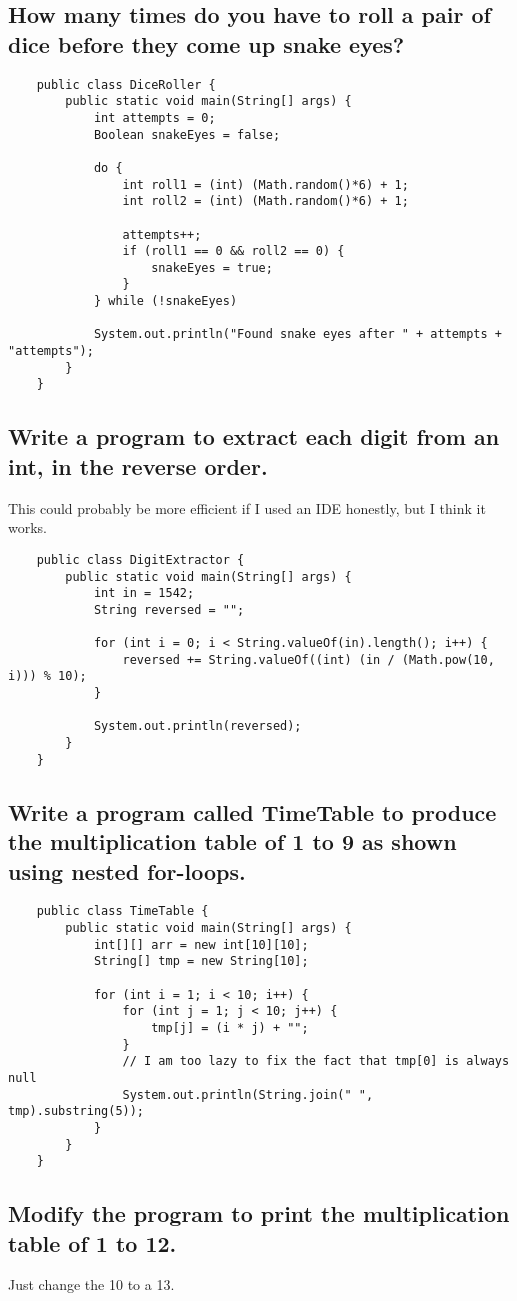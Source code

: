 \documentclass{article}
\begin{document}
    \subsection{How many times do you have to roll a pair of dice before they come up snake eyes?}

    \begin{verbatim}
    public class DiceRoller {
        public static void main(String[] args) {
            int attempts = 0;
            Boolean snakeEyes = false;

            do {
                int roll1 = (int) (Math.random()*6) + 1;
                int roll2 = (int) (Math.random()*6) + 1;

                attempts++;
                if (roll1 == 0 && roll2 == 0) {
                    snakeEyes = true;
                }
            } while (!snakeEyes)
            
            System.out.println("Found snake eyes after " + attempts + "attempts");
        }
    }
    \end{verbatim}

    \subsection{Write a program to extract each digit from an int, in the reverse order.}
    This could probably be more efficient if I used an IDE honestly, but I think it works.

    \begin{verbatim}
    public class DigitExtractor {
        public static void main(String[] args) {
            int in = 1542;
            String reversed = "";

            for (int i = 0; i < String.valueOf(in).length(); i++) {
                reversed += String.valueOf((int) (in / (Math.pow(10, i))) % 10);
            }
            
            System.out.println(reversed);
        }
    }
    \end{verbatim}

    \newpage
    \subsection{Write a program called TimeTable to produce the multiplication table of 1 to 9 as shown using nested for-loops.}

    \begin{verbatim}
    public class TimeTable {
        public static void main(String[] args) {
            int[][] arr = new int[10][10];
            String[] tmp = new String[10];

            for (int i = 1; i < 10; i++) {
                for (int j = 1; j < 10; j++) {
                    tmp[j] = (i * j) + "";
                }
                // I am too lazy to fix the fact that tmp[0] is always null
                System.out.println(String.join(" ", tmp).substring(5));
            }
        }
    }
    \end{verbatim}

    \subsection{Modify the program to print the multiplication table of 1 to 12.}

    Just change the 10 to a 13.
\end{document}
